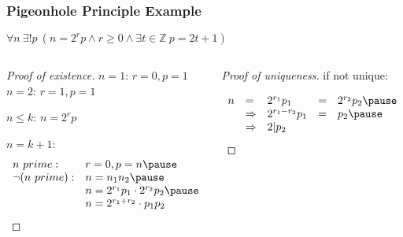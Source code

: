 \documentclass[dvipsnames]{beamer}
\begin{document}
\begin{frame}
  \frametitle{Pigeonhole Principle Example}

  \begin{theorem}
    $\forall n~\exists ! p~
      (n = 2^r p \wedge r \geq 0 \wedge \exists t \in \mathbb Z~p = 2t + 1)$\\
  \end{theorem}

  \pause
  \begin{columns}[t]
    \begin{proof}[Proof of existence]
      $n = 1$: $r = 0, p = 1$\\
      $n = 2$: $r = 1, p = 1$

      \pause
      $n \leq k$: $n = 2^r p$

      \pause
      $n = k + 1$:
      \[
        \begin{array}{ll}
          n~prime:        & r = 0, p = n\pause\\
          \neg (n~prime): & n = n_1 n_2\pause\\
                          & n = 2^{r_1} p_1 \cdot 2^{r_2} p_2\pause\\
                          & n = 2^{r_1+r_2} \cdot p_1 p_2
        \end{array}
      \]
    \end{proof}

    \pause
    \begin{proof}[Proof of uniqueness]
      if not unique:

      \pause
      \[
        \begin{array}{lllll}
          n & =           & 2^{r_1} p_1     & = & 2^{r_2} p_2\pause\\
            & \Rightarrow & 2^{r_1-r_2} p_1 & = & p_2\pause\\
            & \Rightarrow & 2 | p_2
        \end{array}
      \]
    \end{proof}
  \end{columns}
\end{frame}
\end{document}
